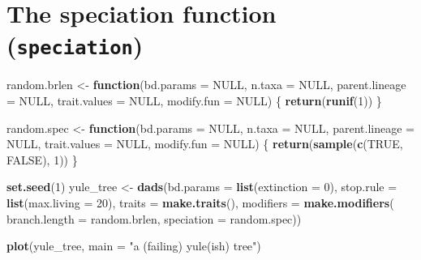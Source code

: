 \documentclass[]{book}
\newenvironment{Shaded}{\begin{snugshade}}{\end{snugshade}}
\newcommand{\ControlFlowTok}[1]{\textcolor[rgb]{0.13,0.29,0.53}{\textbf{#1}}}
\newcommand{\DataTypeTok}[1]{\textcolor[rgb]{0.13,0.29,0.53}{#1}}
\newcommand{\DecValTok}[1]{\textcolor[rgb]{0.00,0.00,0.81}{#1}}
\newcommand{\KeywordTok}[1]{\textcolor[rgb]{0.13,0.29,0.53}{\textbf{#1}}}
\newcommand{\NormalTok}[1]{#1}
\newcommand{\OtherTok}[1]{\textcolor[rgb]{0.56,0.35,0.01}{#1}}
\newcommand{\StringTok}[1]{\textcolor[rgb]{0.31,0.60,0.02}{#1}}
\begin{document}
\hypertarget{the-speciation-function-speciation}{%
\section{\texorpdfstring{The speciation function (\texttt{speciation})}{The speciation function (speciation)}}\label{the-speciation-function-speciation}}

\begin{Shaded}
\begin{Highlighting}[]
\NormalTok{random.brlen <-}\StringTok{ }\ControlFlowTok{function}\NormalTok{(}\DataTypeTok{bd.params =} \OtherTok{NULL}\NormalTok{,}
                         \DataTypeTok{n.taxa =} \OtherTok{NULL}\NormalTok{,}
                         \DataTypeTok{parent.lineage =} \OtherTok{NULL}\NormalTok{,}
                         \DataTypeTok{trait.values =} \OtherTok{NULL}\NormalTok{,}
                         \DataTypeTok{modify.fun =} \OtherTok{NULL}\NormalTok{) \{}
    \KeywordTok{return}\NormalTok{(}\KeywordTok{runif}\NormalTok{(}\DecValTok{1}\NormalTok{))}
\NormalTok{\}}

\NormalTok{random.spec  <-}\StringTok{ }\ControlFlowTok{function}\NormalTok{(}\DataTypeTok{bd.params =} \OtherTok{NULL}\NormalTok{,}
                         \DataTypeTok{n.taxa =} \OtherTok{NULL}\NormalTok{,}
                         \DataTypeTok{parent.lineage =} \OtherTok{NULL}\NormalTok{,}
                         \DataTypeTok{trait.values =} \OtherTok{NULL}\NormalTok{,}
                         \DataTypeTok{modify.fun =} \OtherTok{NULL}\NormalTok{) \{}
    \KeywordTok{return}\NormalTok{(}\KeywordTok{sample}\NormalTok{(}\KeywordTok{c}\NormalTok{(}\OtherTok{TRUE}\NormalTok{, }\OtherTok{FALSE}\NormalTok{), }\DecValTok{1}\NormalTok{))}
\NormalTok{\}}

\KeywordTok{set.seed}\NormalTok{(}\DecValTok{1}\NormalTok{)}
\NormalTok{yule_tree <-}\StringTok{ }\KeywordTok{dads}\NormalTok{(}\DataTypeTok{bd.params =} \KeywordTok{list}\NormalTok{(}\DataTypeTok{extinction =} \DecValTok{0}\NormalTok{),}
                     \DataTypeTok{stop.rule =} \KeywordTok{list}\NormalTok{(}\DataTypeTok{max.living =} \DecValTok{20}\NormalTok{),}
                     \DataTypeTok{traits    =} \KeywordTok{make.traits}\NormalTok{(),}
                     \DataTypeTok{modifiers =} \KeywordTok{make.modifiers}\NormalTok{(}
                        \DataTypeTok{branch.length =}\NormalTok{ random.brlen,}
                        \DataTypeTok{speciation    =}\NormalTok{ random.spec))}

\KeywordTok{plot}\NormalTok{(yule_tree, }\DataTypeTok{main =} \StringTok{"a (failing) yule(ish) tree"}\NormalTok{)}
\end{Highlighting}
\end{Shaded}
\end{document}
